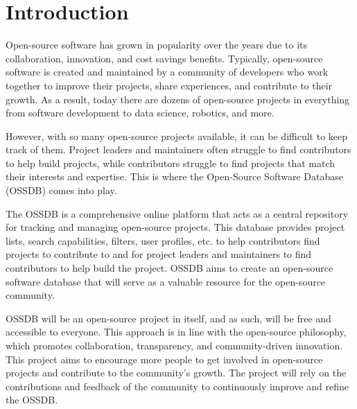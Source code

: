 \pagebreak
\section{Introduction}
Open-source software has grown in popularity over the years due to its collaboration, innovation, and cost savings benefits.
Typically, open-source software is created and maintained by a community of developers who work together to improve their projects, share experiences, and contribute to their growth.
As a result, today there are dozens of open-source projects in everything from software development to data science, robotics, and more.

However, with so many open-source projects available, it can be difficult to keep track of them.
Project leaders and maintainers often struggle to find contributors to help build projects, while contributors struggle to find projects that match their interests and expertise.
This is where the Open-Source Software Database (OSSDB) comes into play.

The OSSDB is a comprehensive online platform that acts as a central repository for tracking and managing open-source projects.
This database provides project lists, search capabilities, filters, user profiles, etc. to help contributors find projects to contribute
to and for project leaders and maintainers to find contributors to help build the project.
OSSDB aims to create an open-source software database that will serve as a valuable resource for the open-source community.

OSSDB will be an open-source project in itself, and as such, will be free and accessible to everyone.
This approach is in line with the open-source philosophy, which promotes collaboration, transparency, and community-driven innovation.
This project aims to encourage more people to get involved in open-source projects and contribute to the community's growth.
The project will rely on the contributions and feedback of the community to continuously improve and refine the OSSDB.

